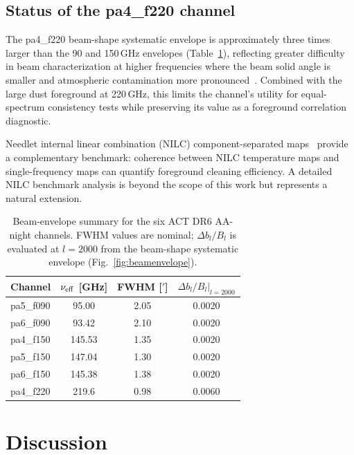 \documentclass[twocolumn,showpacs,preprintnumbers,amsmath,amssymb,floatfix,prd]{revtex4-2}
\def\ell{l}%
\begin{document}
\subsection{Status of the pa4\_f220 channel}\label{sec:220status}

The pa4\_f220 beam-shape systematic envelope is approximately three times
larger than the 90 and 150\,GHz envelopes
(Table~\ref{tab:beamenvelope}), reflecting greater difficulty in beam
characterization at higher frequencies where the beam solid angle is
smaller and atmospheric contamination more
pronounced~\cite{Thornton2016,Naess2025}.  Combined with the large dust
foreground at 220\,GHz, this limits the channel's utility for
equal-spectrum consistency tests while preserving its value as a
foreground correlation diagnostic.

Needlet internal linear combination (NILC) component-separated
maps~\cite{Coulton2024,Delabrouille2009,Remazeilles2011} provide a
complementary benchmark: coherence between NILC temperature maps and
single-frequency maps can quantify foreground cleaning efficiency.  A
detailed NILC benchmark analysis is beyond the scope of this work but
represents a natural extension.

\begin{table}[t]
\centering
\caption{Beam-envelope summary for the six ACT DR6 AA-night channels.
FWHM values are nominal; $\Delta b_\ell/B_\ell$ is evaluated at
$\ell=2000$ from the beam-shape systematic envelope
(Fig.~\ref{fig:beamenvelope}).}
\label{tab:beamenvelope}
\begin{tabular}{lccc}
\toprule
Channel & $\nu_{\rm eff}$ [GHz] & FWHM [$'$] & $\Delta b_\ell/B_\ell|_{\ell=2000}$ \\
\midrule
pa5\_f090 & 95.00 & 2.05 & 0.0020 \\
pa6\_f090 & 93.42 & 2.10 & 0.0020 \\
pa4\_f150 & 145.53 & 1.35 & 0.0020 \\
pa5\_f150 & 147.04 & 1.30 & 0.0020 \\
pa6\_f150 & 145.38 & 1.38 & 0.0020 \\
pa4\_f220 & 219.6 & 0.98 & 0.0060 \\
\bottomrule
\end{tabular}
\end{table}

\section{Discussion}\label{sec:discussion}
\end{document}
